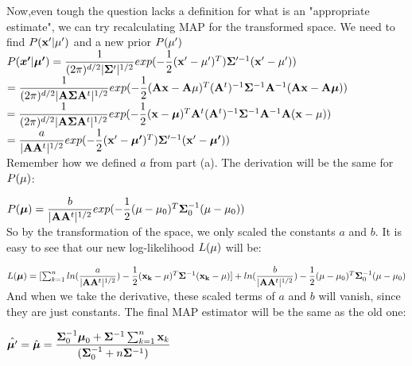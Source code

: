 \documentclass[12pt]{article}
\begin{document}
Now,even tough the question lacks a definition for what is an "appropriate estimate", we can try recalculating MAP  for the transformed space. We need to find $P(\bold x' | \bold \mu')$ and a new prior $P(\bold\mu')$ \\


$P( \boldsymbol{x'} | \boldsymbol{\mu'} ) = \dfrac{1}{(2\pi)^{d/2}|\bold\Sigma'|^{1/2}}exp(-\dfrac{1}{2}(\bold{x'}-\bold{\mu'})^T) \bold \Sigma'^{-1} (\bold{x'}-\bold{\mu'})) $ \\

$ =  \dfrac{1}{(2\pi)^{d/2}|\bold A \bold\Sigma\bold A^t|^{1/2}}exp(-\dfrac{1}{2}(\bold A \bold{x}-\bold A \bold{\mu})^T  (\bold  A^t)^{-1}  \bold \Sigma^{-1} \bold A^{-1} (\bold A \bold{x}- \bold A \boldsymbol{\mu})) $ \\

$ =  \dfrac{1}{(2\pi)^{d/2}|\bold A \bold\Sigma\bold A^t|^{1/2}}  exp(-\dfrac{1}{2}(\bold{x}-\boldsymbol{\mu})^T  \bold A^t (\bold  A^t)^{-1}  \bold \Sigma^{-1} \bold A^{-1} \bold A (\bold{x}- \bold{\mu})) $ \\

$ = \dfrac{a}{  |\bold A \bold A^t|^{1/2} }exp(-\dfrac{1}{2}(\bold{x'}-\boldsymbol{\mu'})^T) \bold \Sigma'^{-1} (\bold{x'}-\boldsymbol{\mu'})) $ \\

Remember how we defined $a$ from part (a). The derivation will be the same for $P(\bold{\mu}) $:


$P(\boldsymbol{\mu})  = \dfrac{b}{  |\bold A \bold A^t|^{1/2} }exp(-\dfrac{1}{2}(\bold{\mu}-\bold{\mu}_0)^T  \bold\Sigma_0^{-1} (\bold{\mu}-\bold{\mu}_0)) $ \\

So by the transformation of the space, we only scaled the constants $a$ and $b$. It is easy to see that our new log-likelihood $L(\bold\mu)$ will be:

$L(\boldsymbol\mu) = [\sum_{k=1}^{n} ln(\dfrac{a}{  |\bold A \bold A^t|^{1/2} })-\dfrac{1}{2}(\bold{x_k}-\bold{\mu})^T\bold\Sigma^{-1}(\bold{x_k}-\bold{\mu}) ]+ ln(\dfrac{b}{  |\bold A \bold A^t|^{1/2} }) -\dfrac{1}{2}(\bold{\mu}-\bold{\mu}_0)^T\bold\Sigma_0^{-1}(\bold{\mu}-\bold{\mu}_0) $\\

And when we take the derivative, these scaled terms of $a$ and $b$ will vanish, since they are just constants. The final MAP estimator will be the same as the old one:

$\hat{\boldsymbol\mu'}  = \hat{\boldsymbol\mu} = \dfrac{\bold\Sigma_0^{-1}\boldsymbol\mu_0 + \bold \Sigma^{-1}\sum_{k=1}^n  \bold x_k }{(\bold\Sigma_0^{-1} + n\bold \Sigma^{-1} ) } $\\
\end{document}
